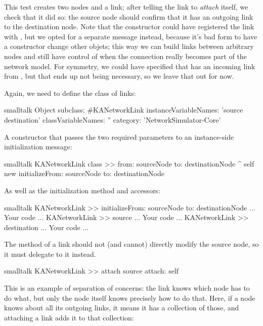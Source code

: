 \documentclass[10pt,twoside,english]{_support/latex/sbabook/sbabook}
\begin{document}
This test creates two nodes and a link; after telling the link to \textit{attach} itself, we check that it did so: the source node should confirm that it has an outgoing link to the destination node.
Note that the constructor could have registered the link with , but we opted for a separate message  instead, because it's bad form to have a constructor change other objets; this way we can build links between arbitrary nodes and still have control of when the connection really becomes part of the network model.
For symmetry, we could have specified that  has an incoming link from , but that ends up not being necessary, so we leave that out for now.

Again, we need to define the class of links:

\begin{displaycode}{smalltalk}
Object subclass: #KANetworkLink
    instanceVariableNames: 'source destination'
    classVariableNames: ''
    category: 'NetworkSimulator-Core'
\end{displaycode}

A constructor that passes the two required parameters to an instance-side initialization message:

\begin{displaycode}{smalltalk}
KANetworkLink class >> from: sourceNode to: destinationNode
    ^ self new
        initializeFrom: sourceNode to: destinationNode
\end{displaycode}

As well as the initialization method and accessors:

\begin{displaycode}{smalltalk}
KANetworkLink >> initializeFrom: sourceNode to: destinationNode
	... Your code ...
KANetworkLink >> source
	... Your code ...
KANetworkLink >> destination
	... Your code ...
\end{displaycode}

The  method of a link should not (and cannot) directly modify the source node, so it must delegate to it instead.

\begin{displaycode}{smalltalk}
KANetworkLink >> attach
    source attach: self
\end{displaycode}

This is an example of separation of concerns: the link knows which node has to do what, but only the node itself knows precisely how to do that.
Here, if a node knows about all its outgoing links, it means it has a collection of those, and attaching a link adds it to that collection:
\end{document}
